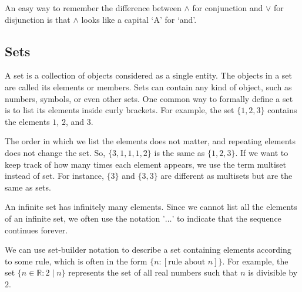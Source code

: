 \documentclass[a4paper, twoside]{article}
\newcommand{\R}{\mathbb{R}}
\begin{document}
An easy way to remember the difference between \(\land\) for conjunction and \(\lor\) for disjunction is that \(\land\) looks like a capital `A' for `and'. 


\newpage

\subsection{Sets}
A set is a collection of objects considered as a single entity. The objects in a set are called its elements or members. Sets can contain any kind of object, such as numbers, symbols, or even other sets. One common way to formally define a set is to list its elements inside curly brackets. For example, the set \(\{1, 2, 3\}\) contains the elements \(1\), \(2\), and \(3\).

The order in which we list the elements does not matter, and repeating elements does not change the set. So, \(\{3, 1, 1, 1, 2\}\) is the same as \(\{1, 2, 3\}\). If we want to keep track of how many times each element appears, we use the term multiset instead of set. For instance, \(\{3\}\) and \(\{3, 3\}\) are different as multisets but are the same as sets. 

An infinite set has infinitely many elements. Since we cannot list all the elements of an infinite set, we often use the notation '\(\ldots\)' to indicate that the sequence continues forever.

We can use set-builder notation to describe a set containing elements according to some rule, which is often in the form \(\{n : [\text{rule about } n]\}\). For example, the set \(\{n \in \R : 2 \mid n\}\) represents the set of all real numbers such that \(n\) is divisible by \(2\).
\end{document}
